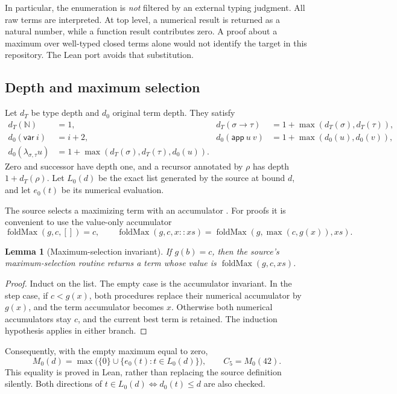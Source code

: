 \documentclass[11pt,a4paper]{article}
\newtheorem{lemma}[theorem]{Lemma}
\theoremstyle{definition}
\newcommand{\N}{\mathbb N}
\newcommand{\code}[1]{\texttt{\detokenize{#1}}}
\begin{document}
In particular, the enumeration is \emph{not} filtered by an external typing
judgment. All raw terms are interpreted. At top level, a numerical result is
returned as a natural number, while a function result contributes zero. A
proof about a maximum over well-typed closed terms alone would not identify
the target in this repository. The Lean port avoids that substitution.

\subsection{Depth and maximum selection}

Let \(d_T\) be type depth and \(d_0\) original term depth. They satisfy
\begin{align*}
 d_T(\N)&=1,&
 d_T(\sigma\to\tau)&=1+\max(d_T(\sigma),d_T(\tau)),\\
 d_0(\mathsf{var}\ i)&=i+2,&
 d_0(\mathsf{app}\ u\ v)&=1+\max(d_0(u),d_0(v)),\\
 d_0(\lambda_{\sigma,\tau}u)
   &=1+\max(d_T(\sigma),d_T(\tau),d_0(u)).
\end{align*}
Zero and successor have depth one, and a recursor annotated by \(\rho\)
has depth \(1+d_T(\rho)\). Let \(L_0(d)\) be the exact list generated by the
source at bound \(d\), and let \(e_0(t)\) be its numerical evaluation.

The source selects a maximizing term with an accumulator \code{maxBy}. For
proofs it is convenient to use the value-only accumulator
\[
 \operatorname{foldMax}(g,c,[]) = c,\qquad
 \operatorname{foldMax}(g,c,x::xs)
    =\operatorname{foldMax}(g,\max(c,g(x)),xs).
\]

\begin{lemma}[Maximum-selection invariant]
If \(g(b)=c\), then the source's maximum-selection routine returns a term
whose value is \(\operatorname{foldMax}(g,c,xs)\).
\end{lemma}
\begin{proof}
Induct on the list. The empty case is the accumulator invariant. In the
step case, if \(c<g(x)\), both procedures replace their numerical accumulator
by \(g(x)\), and the term accumulator becomes \(x\). Otherwise both numerical
accumulators stay \(c\), and the current best term is retained. The induction
hypothesis applies in either branch.
\end{proof}

Consequently, with the empty maximum equal to zero,
\[
 M_0(d)=\max\bigl(\{0\}\cup\{e_0(t):t\in L_0(d)\}\bigr),
 \qquad C_5=M_0(42).
\]
This equality is proved in Lean, rather than replacing the source definition
silently. Both directions of
\(t\in L_0(d)\iff d_0(t)\le d\) are also checked.
\end{document}
